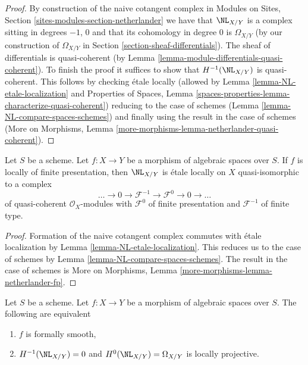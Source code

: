 \begin{proof}
By construction of the naive cotangent complex in
Modules on Sites, Section \ref{sites-modules-section-netherlander}
we have that $\NL_{X/Y}$ is a complex sitting in degrees $-1$, $0$
and that its cohomology in degree $0$ is $\Omega_{X/Y}$ (by our
construction of $\Omega_{X/Y}$ in Section \ref{section-sheaf-differentials}).
The sheaf of differentials is quasi-coherent (by
Lemma \ref{lemma-module-differentials-quasi-coherent}).
To finish the proof it suffices to show that $H^{-1}(\NL_{X/Y})$
is quasi-coherent. This follows by checking \'etale locally
(allowed by Lemma \ref{lemma-NL-etale-localization} and
Properties of Spaces, Lemma
\ref{spaces-properties-lemma-characterize-quasi-coherent})
reducing to the case of schemes
(Lemma \ref{lemma-NL-compare-spaces-schemes})
and finally using the result in the case of schemes
(More on Morphisms, Lemma
\ref{more-morphisms-lemma-netherlander-quasi-coherent}).
\end{proof}

\begin{lemma}
\label{lemma-netherlander-fp}
Let $S$ be a scheme.
Let $f : X \to Y$ be a morphism of algebraic spaces over $S$.
If $f$ is locally of finite
presentation, then $\NL_{X/Y}$ is \'etale locally on $X$
quasi-isomorphic to a complex
$$
\ldots \to 0 \to \mathcal{F}^{-1} \to \mathcal{F}^0 \to 0 \to \ldots
$$
of quasi-coherent $\mathcal{O}_X$-modules
with $\mathcal{F}^0$ of finite presentation
and $\mathcal{F}^{-1}$ of finite type.
\end{lemma}

\begin{proof}
Formation of the naive cotangent complex commutes with \'etale
localization by Lemma \ref{lemma-NL-etale-localization}.
This reduces us to the case of schemes by
Lemma \ref{lemma-NL-compare-spaces-schemes}.
The result in the case of schemes is
More on Morphisms, Lemma
\ref{more-morphisms-lemma-netherlander-fp}.
\end{proof}

\begin{lemma}
\label{lemma-NL-formally-smooth}
Let $S$ be a scheme.
Let $f : X \to Y$ be a morphism of algebraic spaces over $S$.
The following are equivalent
\begin{enumerate}
\item $f$ is formally smooth,
\item $H^{-1}(\NL_{X/Y}) = 0$ and $H^0(\NL_{X/Y}) = \Omega_{X/Y}$
is locally projective.
\end{enumerate}
\end{lemma}

